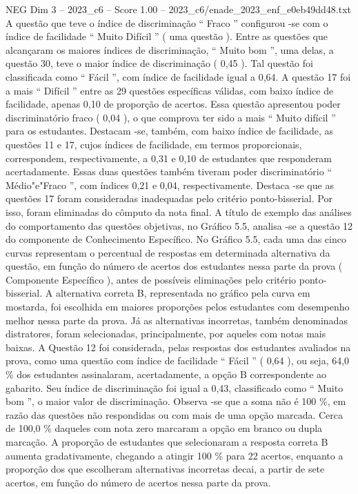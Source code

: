 \begin{textsample}{NEG Dim 3 – 2023\_c6 – Score 1.00 – 2023\_c6/enade\_2023\_enf\_e0eb49dd48.txt}
A questão que teve o índice de discriminação “ Fraco ” configurou -se com o índice de facilidade “ Muito Difícil ” ( uma questão ).
Entre as questões que alcançaram os maiores índices de discriminação, “ Muito bom ”, uma delas, a questão 30, teve o maior índice de discriminação ( 0,45 ).
Tal questão foi classificada como “ Fácil ”, com índice de facilidade igual a 0,64.
A questão 17 foi a mais “ Difícil ” entre as 29 questões específicas válidas, com baixo índice de facilidade, apenas 0,10 de proporção de acertos.
Essa questão apresentou poder discriminatório fraco ( 0,04 ), o que comprova ter sido a mais “ Muito difícil ” para os estudantes.
Destacam -se, também, com baixo índice de facilidade, as questões 11 e 17, cujos índices de facilidade, em termos proporcionais, correspondem, respectivamente, a 0,31 e 0,10 de estudantes que responderam acertadamente.
Essas duas questões também tiveram poder discriminatório “ Médio"e"Fraco ”, com índices 0,21 e 0,04, respectivamente.
Destaca -se que as questões 17 foram consideradas inadequadas pelo critério ponto-bisserial.
Por isso, foram eliminadas do cômputo da nota final.
A título de exemplo das análises do comportamento das questões objetivas, no Gráfico 5.5, analisa -se a questão 12 do componente de Conhecimento Específico.
No Gráfico 5.5, cada uma das cinco curvas representam o percentual de respostas em determinada alternativa da questão, em função do número de acertos dos estudantes nessa parte da prova ( Componente Específico ), antes de possíveis eliminações pelo critério ponto-bisserial.
A alternativa correta B, representada no gráfico pela curva em mostarda, foi escolhida em maiores proporções pelos estudantes com desempenho melhor nessa parte da prova.
Já as alternativas incorretas, também denominadas distratores, foram selecionadas, principalmente, por aqueles com notas mais baixas.
A Questão 12 foi considerada, pelas respostas dos estudantes avaliados na prova, como uma questão com índice de facilidade “ Fácil ” ( 0,64 ), ou seja, 64,0 \% dos estudantes assinalaram, acertadamente, a opção B correspondente ao gabarito.
Seu índice de discriminação foi igual a 0,43, classificado como “ Muito bom ”, o maior valor de discriminação.
Observa -se que a soma não é 100 \%, em razão das questões não respondidas ou com mais de uma opção marcada.
Cerca de 100,0 \% daqueles com nota zero marcaram a opção em branco ou dupla marcação.
A proporção de estudantes que selecionaram a resposta correta B aumenta gradativamente, chegando a atingir 100 \% para 22 acertos, enquanto a proporção dos que escolheram alternativas incorretas decai, a partir de sete acertos, em função do número de acertos nessa parte da prova.

\end{textsample}
